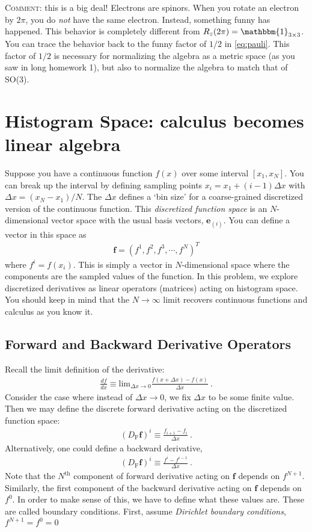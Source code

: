\documentclass[12pt]{article}
\numberwithin{equation}{section}    %
\renewcommand{\vec}[1]{\mathbf{#1}} %
\begin{document}
\textsc{Comment:} this is a big deal! Electrons are spinors. When you rotate an electron by $2\pi$, you do \emph{not} have the same electron. Instead, something funny has happened. This behavior is completely different from $R_z(2\pi) = \mathbbm{1}_{3\times 3}$. You can trace the behavior back to the funny factor of $1/2$ in \eqref{eq:pauli}. This factor of $1/2$ is necessary for normalizing the algebra as a metric space (as you saw in long homework 1), but also to normalize the algebra to match that of SO(3).




\section{Histogram Space: calculus becomes linear algebra}

Suppose you have a continuous function $f(x)$ over some interval $[x_1, x_N]$. You can break up the interval by defining sampling points $x_i = x_1 + (i-1)\Delta x$ with $\Delta x = (x_N-x_1)/N$. The $\Delta x$ defines a `bin size' for a coarse-grained discretized version of the continuous function. This \emph{discretized function space} is an $N$-dimensional vector space with the usual basis vectors, $\vec{e}_{(i)}$. You can define a vector in this space as
\begin{align}
	\vec{f} = (f^1, f^2, f^3, \cdots, f^N)^T
\end{align}
where $f^i = f(x_i)$. This is simply a vector in $N$-dimensional space where the components are the sampled values of the function.  In this problem, we explore discretized derivatives as linear operators (matrices) acting on histogram space. You should keep in mind that the $N\to\infty$ limit recovers continuous functions and calculus as you know it.

\subsection{Forward and Backward Derivative Operators}

Recall the limit definition of the derivative:
\begin{align}
	\frac{df}{dx} \equiv \text{lim}_{\Delta x\to 0} \frac{f(x+\Delta x) - f(x)}{\Delta x} \ .
\end{align}
Consider the case where instead of $\Delta x \to 0$, we fix $\Delta x$ to be some finite value. Then we may define the discrete forward derivative acting on the discretized function space:
\begin{align}
	(D_\text{F} \vec{f})^i \equiv \frac{f_{i+1}-f_i}{\Delta x} \ .
\end{align}
Alternatively, one could define a backward derivative,
\begin{align}
	(D_\text{F} \vec{f})^i \equiv \frac{f^{i}-f^{i-1}}{\Delta x} \ .
\end{align}
Note that the $N^{\text{th}}$ component of forward derivative acting on $\vec{f}$ depends on $f^{N+1}$. Similarly, the first component of the backward derivative acting on $\vec{f}$ depends on $f^{0}$. In order to make sense of this, we have to define what these values are. These are called boundary conditions. First, assume \emph{Dirichlet boundary conditions}, $f^{N+1} = f^0 = 0$
\end{document}
